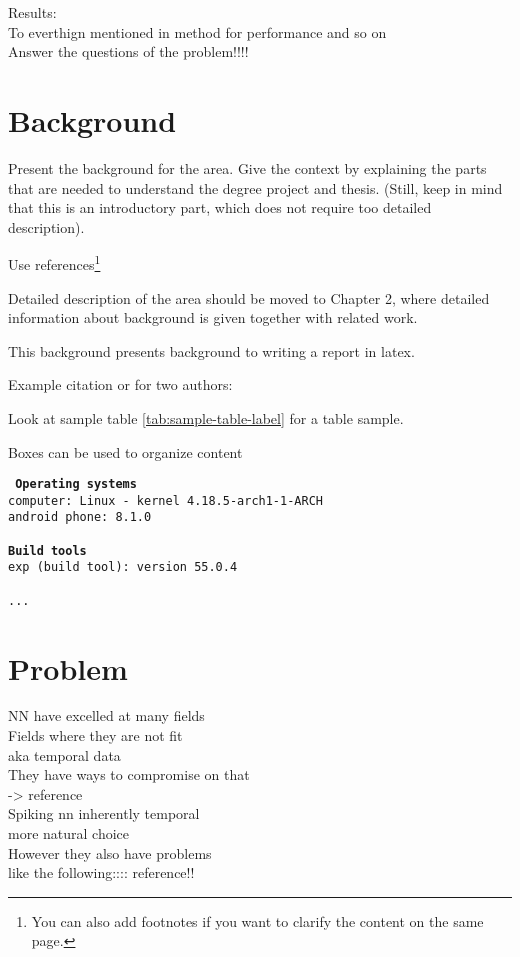 Results:\\
To everthign mentioned in method for performance and so on\\
Answer the questions of the problem!!!!\\


\section{Background}
\label{sec:background}
Present the background for the area. Give the context by explaining the parts that are needed to understand the degree project and thesis. (Still, keep in mind that this is an introductory part, which does not require too detailed description).

Use references\footnote{You can also add footnotes if you want to clarify the content on the same page.}

Detailed description of the area should be moved to Chapter 2, where detailed information about background is given together with related work.


This background presents background to writing a report in latex.


Example citation \cite{Jones2017} or for two authors: \cite{Jones2017, Liu2017}

Look at sample table \ref{tab:sample-table-label} for a table sample.



Boxes can be used to organize content

\begin{tcolorbox}[title={Development environment for prototype}]
	\tt{
		\textbf{Operating systems }\\
		computer: Linux - kernel 4.18.5-arch1-1-ARCH\\
		android phone: 8.1.0\\
		~\\
		\textbf{Build tools}\\
		exp (build tool): version 55.0.4\\
		~\\
		...
	}
\end{tcolorbox}

\section{Problem}
NN have excelled at many fields\\
Fields where they are not fit\\ aka temporal data\\
They have ways to compromise on that \\ -> reference\\
Spiking nn inherently temporal \\
more natural choice\\
However they also have problems\\
like the following:::: reference!!\\
